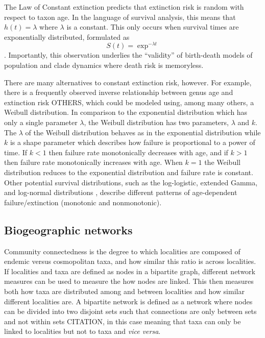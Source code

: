 \documentclass[12pt,letterpaper]{article}
\begin{document}
The Law of Constant extinction \citep{VanValen1973} predicts that extinction risk is random with respect to taxon age. In the language of survival analysis, this means that \(h(t) = \lambda\) where \(\lambda\) is a constant. This only occurs when survival times are exponentially distributed, formulated as 
\begin{equation}
  S(t) = \exp ^{- \lambda t}
  \label{eq:expsurv}
\end{equation}. Importantly, this observation underlies the ``validity'' of birth-death models of population and clade dynamics where death risk is memoryless.

There are many alternatives to constant extinction risk, however. For example, there is a frequently observed inverse relationship between genus age and extinction risk \citep{Finnegan2008} OTHERS, which could be modeled using, among many others, a Weibull distribution. In comparison to the exponential distribution which has only a single parameter \(\lambda\), the Weibull distribution has two parameters, \(\lambda\) and \(k\). The \(\lambda\) of the Weibull distribution behaves as in the exponential distribution while \(k\) is a shape parameter which describes how failure is proportional to a power of time. If \(k < 1\) then failure rate monotonically decreases with age, and if \(k > 1\) then failure rate monotonically increases with age. When \(k = 1\) the Weibull distribution reduces to the exponential distribution and failure rate is constant. Other potential survival distributions, such as the log-logistic, extended Gamma, and log-normal distributions \citep{Kleinbaum2005}, describe different patterns of age-dependent failure/extinction (monotonic and nonmonotonic).


\subsection{Biogeographic networks} \label{sec:bionet}
Community connectedness is the degree to which localities are composed of endemic versus cosmopolitan taxa, and how similar this ratio is across localities. If localities and taxa are defined as nodes in a bipartite graph, different network measures can be used to measure the how nodes are linked. This then measures both how taxa are distributed among and between localities and how similar different localities are. A bipartite network is defined as a network where nodes can be divided into two disjoint sets such that connections are only between sets and not within sets CITATION, in this case meaning that taxa can only be linked to localities but not to taxa and \textit{vice versa}.
\end{document}
